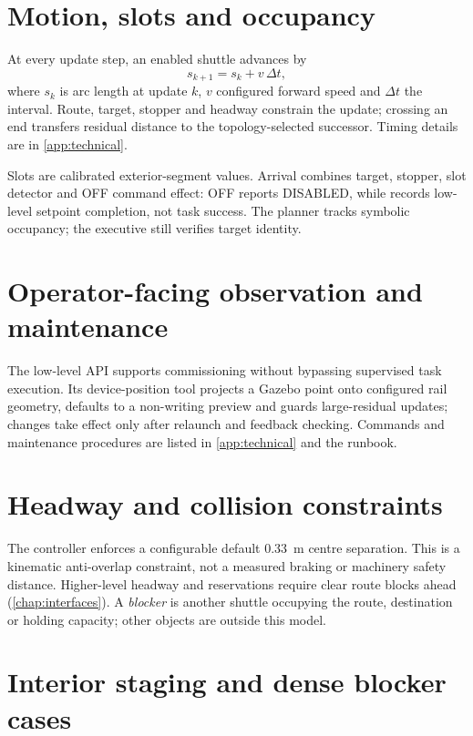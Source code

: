 \section{Motion, slots and occupancy}

At every update step, an enabled shuttle advances by
\begin{equation}
  s_{k+1}=s_k + v\,\Delta t ,
  \label{eq:kinematic-update}
\end{equation}
where \(s_k\) is arc length at update \(k\), \(v\) configured forward speed and
\(\Delta t\) the interval. Route, target, stopper and headway constrain the
update; crossing an end transfers residual distance to the topology-selected
successor. Timing details are in \cref{app:technical}.

Slots are calibrated exterior-segment  values. Arrival combines
target, stopper, slot detector and OFF command effect: OFF reports DISABLED,
while  records low-level setpoint completion, not
task success. The planner tracks symbolic occupancy; the executive still
verifies target identity.

\section{Operator-facing observation and maintenance}

The low-level API supports commissioning without bypassing supervised task
execution. Its device-position tool projects a Gazebo point onto configured rail
geometry, defaults to a non-writing preview and guards large-residual updates;
changes take effect only after relaunch and feedback checking. Commands and
maintenance procedures are listed in \cref{app:technical} and the runbook.

\section{Headway and collision constraints}

The controller enforces a configurable default \SI{0.33}{m} centre separation.
This is a kinematic anti-overlap constraint, not a measured braking or machinery
safety distance. Higher-level
headway and reservations require clear route blocks ahead
(\cref{chap:interfaces}). A \emph{blocker} is another shuttle occupying the
route, destination or holding capacity; other objects are outside this model.

\section{Interior staging and dense blocker cases}

